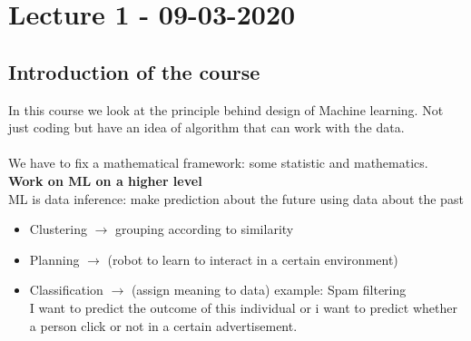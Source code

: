 \documentclass[../main.tex]{subfiles}
\begin{document}
\chapter{Lecture 1 - 09-03-2020}

\section{Introduction of the course}


In this course we look at the principle behind design of Machine learning.
Not just coding but have an idea of algorithm that can work with the data.\\\\
We have to fix a mathematical framework: some statistic and mathematics.\\
\textbf{Work on ML on a higher level}\\
ML is data inference: make prediction about the future using data about the
past\\
\begin{itemize}
\item Clustering $\rightarrow$  grouping according to similarity
\item Planning $\rightarrow$ (robot to learn to interact in a certain environment)
\item Classification $\rightarrow$ (assign meaning to data) example: Spam filtering\\
I want to predict the outcome of this individual or i want to predict whether a
person click or not in a certain advertisement.
\end{itemize}
\end{document}
